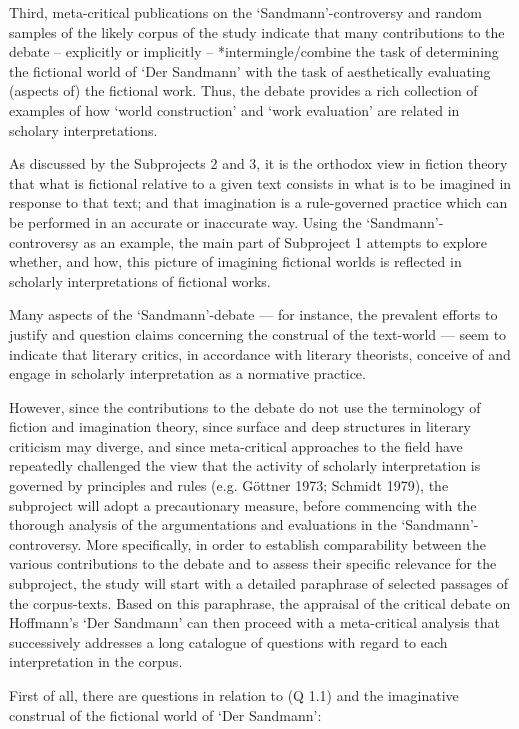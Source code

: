 Third, meta-critical publications on the `Sandmann'-controversy and random samples of the likely corpus of the study indicate that many contributions to the debate -- explicitly or implicitly -- *intermingle/combine the task of determining the fictional world of `Der Sandmann' with the task of aesthetically evaluating (aspects of) the fictional work. Thus, the debate provides a rich collection of examples of how `world construction' and `work evaluation' are related in scholary interpretations.

As discussed by the Subprojects 2 and 3, it is the orthodox view in fiction theory that what is fictional relative to a given text consists in what is to be imagined in response to that text; and that imagination is a rule-governed practice which can be performed in an accurate or inaccurate way. Using the `Sandmann'-controversy as an example, the main part of Subproject 1 attempts to explore whether, and how, this picture of imagining fictional worlds is reflected in scholarly interpretations of fictional works.

Many aspects of the `Sandmann'-debate --- for instance, the prevalent efforts to justify and question claims concerning the construal of the text-world --- seem to indicate that literary critics, in accordance with literary theorists, conceive of and engage in scholarly interpretation as a normative practice.  

However, since the contributions to the debate do not use the terminology of fiction and imagination theory, since surface and deep structures in literary criticism may diverge, and since meta-critical approaches to the field have repeatedly challenged the view that the activity of scholarly interpretation is governed by principles and rules (e.g. G\"ottner 1973; Schmidt 1979), the subproject will adopt a precautionary measure, before commencing with the thorough analysis of the argumentations and evaluations in the `Sandmann'-controversy. More specifically, in order to establish comparability between the various contributions to the debate and to assess their specific relevance for the subproject, the study will start with a detailed paraphrase of selected passages of the corpus-texts. Based on this paraphrase, the appraisal of the critical debate on Hoffmann's `Der Sandmann' can then proceed with a meta-critical analysis that successively addresses a long catalogue of questions with regard to each interpretation in the corpus.

First of all, there are questions in relation to (Q 1.1) and the imaginative construal of the fictional world of `Der Sandmann':

